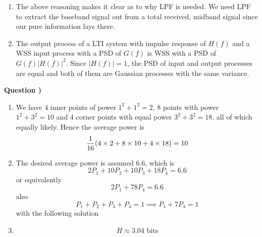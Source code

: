 \documentclass[10pt,letterpaper]{article}
\newcounter{QuestionNumber}
\newcommand{\Q}{
\textbf{Question \theQuestionNumber)}
\stepcounter{QuestionNumber}
}
\begin{document}
\begin{enumerate} [label=\alph*-]
and
The $\cos 4\pi f_ct$ and $\sin 4\pi f_ct$ are modulated by a baseband signal to midband frequency $2f_c$ and are not passed through the ideal low-pass filter. Hence the output of the filter is
which turns into 
$$
Y(t)=\sum_{n=-\infty}^{\infty} \Re\{b_n\}s_\text{RC}(t-nT_s)
$$
after passing through the RRC matched filter (RRC pulse shape) block since
$$
s_\text{RRC}(t)*s_\text{RRC}(t)=s_\text{RC}(t).
$$
\item
The above reasoning makes it clear as to why LPF is needed. We need LPF to extract the baseband signal out from a total received, midband signal since our pure information lays there.
\item
The output process of a LTI system with impulse response of $H(f)$ and a WSS input process with a PSD of $G(f)$ is WSS with a PSD of $G(f)|H(f)|^2$. Since $|H(f)|=1$, the PSD of input and output processes are equal and both of them are Gaussian processes with the same variance.
\end{enumerate}

\Q

\begin{enumerate}[label=\alph*-]
\item
We have 4 inner points of power $1^2+1^2=2$, 8 points with power $1^2+3^2=10$ and 4 corner points with equal power $3^2+3^2=18$, all of which equally likely. Hence the average power is 
$$
{1\over 16}(4\times 2+8\times 10+4\times 18)=10
$$
\item
The desired average power is assumed 6.6, which is
$$
2P_1+10P_2+10P_3+18P_4=6.6
$$
or equivalently
$$
2P_1+78P_4=6.6
$$
also
$$
P_1+P_2+P_3+P_4=1\implies P_1+7P_4=1
$$
with the following solution
\item
$$
H\approx3.04\text{ bits}
$$
\end{enumerate}
\end{document}
